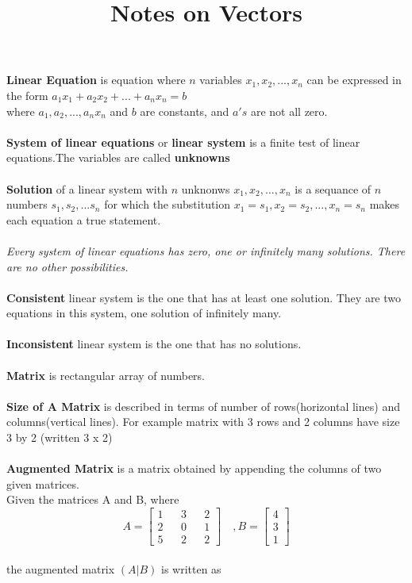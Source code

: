 \documentclass[a4paper, 12pt]{article}
\title{Notes on Vectors}
\begin{document}
 
\textbf{Linear Equation}
is equation where $n$ variables $x_1, x_2, ..., x_n$  can be expressed in the form
$a_1x_1 + a_2x_2 + ... + a_nx_n = b $ \\
where $a_1, a_2, ..., a_nx_n$ and $b$ are constants, and $a's$  are not all zero.
\\
\\
\textbf{System of linear equations} or \textbf{linear system} is a finite test of 
linear equations.The variables are called \textbf{unknowns}
\\
\\
\textbf{Solution} of a linear system with $n$ unknonws $x_1, x_2, ... , x_n$ is 
a sequance of $n$ numbers  $s_1, s_2, ... s_n$ for which the substitution
$x_1 = s_1, x_2 = s_2, ..., x_n = s_n$
makes each equation a true statement.
\\
\\
\textit{Every system of linear equations has zero, one or infinitely many solutions.
There are no other possibilities.}
\\
\\
\textbf{Consistent} linear system is the one that has at least one solution.
They are two equations in this system,  one solution of infinitely many.
\\
\\
\textbf{Inconsistent} linear system is the one that has no solutions.
\\
\\ 
\textbf{Matrix} is rectangular array of numbers.
\\
\\
\textbf{Size of A Matrix} is described in terms of number of rows(horizontal lines)
and columns(vertical lines). For example matrix with 3 rows and 2 columns have size
3 by 2 (written 3 x 2)
\\
\\
\textbf{Augmented Matrix} is a matrix obtained by appending the columns of 
two given matrices.\\
Given the matrices A and B, where
$$
A =
\begin{bmatrix}
1 && 3 && 2 \\
2 && 0 && 1 \\
5 && 2 && 2
\end{bmatrix}
\quad
, B = 
\begin{bmatrix}
4 \\
3 \\
1
\end{bmatrix}
$$
\\
the augmented matrix $(A|B)$ is written as
\end{document}
